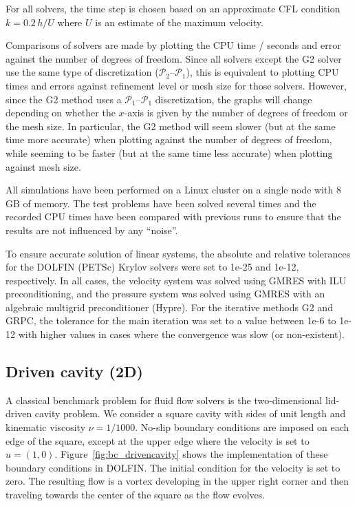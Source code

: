 For all solvers, the time step is chosen based on an approximate CFL
condition $k = 0.2 \, h / U$ where $U$ is an estimate of the maximum
velocity.

Comparisons of solvers are made by plotting the CPU time / seconds and
error against the number of degrees of freedom. Since all solvers
except the G2 solver use the same type of discretization
($\mathcal{P}_2$--$\mathcal{P}_1$), this is equivalent to plotting CPU times and errors
against refinement level or mesh size for those solvers. However,
since the G2 method uses a $\mathcal{P}_1$--$\mathcal{P}_1$ discretization, the graphs
will change depending on whether the $x$-axis is given by the number
of degrees of freedom or the mesh size. In particular, the G2 method
will seem slower (but at the same time more accurate) when plotting
against the number of degrees of freedom, while seeming to be faster
(but at the same time less accurate) when plotting against mesh size.

All simulations have been performed on a Linux cluster on a single
node with 8 GB of memory. The test problems have been solved several
times and the recorded CPU times have been compared with previous runs
to ensure that the results are not influenced by any ``noise''.

To ensure accurate solution of linear systems, the absolute and
relative tolerances for the DOLFIN (PETSc) Krylov solvers were set to
1e-25 and 1e-12, respectively. In all cases, the velocity system was
solved using GMRES with ILU preconditioning, and the pressure system
was solved using GMRES with an algebraic multigrid preconditioner
(Hypre). For the iterative methods G2 and GRPC, the tolerance for the
main iteration was set to a value between 1e-6 to 1e-12 with higher
values in cases where the convergence was slow (or non-existent).

\subsection{Driven cavity (2D)}

A classical benchmark problem for fluid flow solvers is the
two-dimensional lid-driven cavity problem. We consider a square cavity
with sides of unit length and kinematic viscosity $\nu =
1/1000$. No-slip boundary conditions are imposed on each edge of the
square, except at the upper edge where the velocity is set to $u = (1,
0)$. Figure~\ref{fig:bc_drivencavity} shows the implementation of
these boundary conditions in DOLFIN. The initial condition for the
velocity is set to zero. The resulting flow is a vortex developing in
the upper right corner and then traveling towards the center of the
square as the flow evolves.

